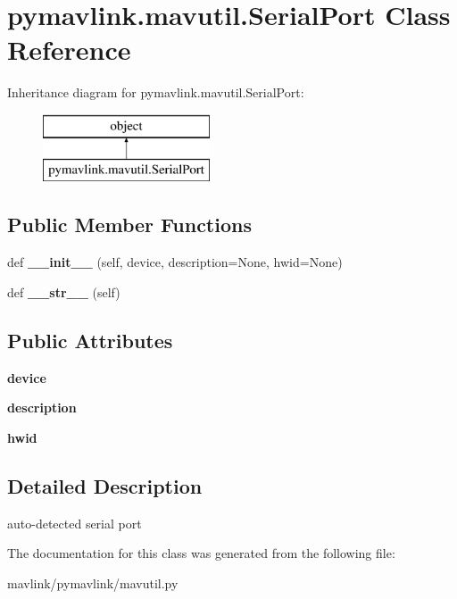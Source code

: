 \hypertarget{classpymavlink_1_1mavutil_1_1SerialPort}{}\section{pymavlink.\+mavutil.\+Serial\+Port Class Reference}
\label{classpymavlink_1_1mavutil_1_1SerialPort}
Inheritance diagram for pymavlink.\+mavutil.\+Serial\+Port\+:\begin{figure}[H]
\begin{center}
\leavevmode
\includegraphics[height=2.000000cm]{classpymavlink_1_1mavutil_1_1SerialPort}
\end{center}
\end{figure}
\subsection*{Public Member Functions}
\begin{DoxyCompactItemize}
\item 
\mbox{\label{classpymavlink_1_1mavutil_1_1SerialPort_a1fc475b038be7d01e9bbd3f8b4d8c573}} 
def {\bfseries \+\_\+\+\_\+init\+\_\+\+\_\+} (self, device, description=None, hwid=None)
\item 
\mbox{\label{classpymavlink_1_1mavutil_1_1SerialPort_a577fb69c14065d576592d2e15977366a}} 
def {\bfseries \+\_\+\+\_\+str\+\_\+\+\_\+} (self)
\end{DoxyCompactItemize}
\subsection*{Public Attributes}
\begin{DoxyCompactItemize}
\item 
\mbox{\label{classpymavlink_1_1mavutil_1_1SerialPort_adab21d2b77fd40dd3f44247c56756546}} 
{\bfseries device}
\item 
\mbox{\label{classpymavlink_1_1mavutil_1_1SerialPort_ac3943442497a938ab8be65fcfce4eb62}} 
{\bfseries description}
\item 
\mbox{\label{classpymavlink_1_1mavutil_1_1SerialPort_a582a43548e6708f07c7c8daaa73b8980}} 
{\bfseries hwid}
\end{DoxyCompactItemize}


\subsection{Detailed Description}
\begin{DoxyVerb}auto-detected serial port\end{DoxyVerb}
 

The documentation for this class was generated from the following file\+:\begin{DoxyCompactItemize}
\item 
mavlink/pymavlink/mavutil.\+py\end{DoxyCompactItemize}
